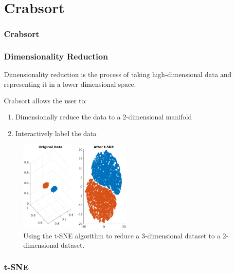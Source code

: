 \documentclass{beamer}
\begin{document}

\section{Crabsort}

\begin{frame}
  \frametitle{Crabsort}
\end{frame}


\begin{frame}
  \frametitle{Dimensionality Reduction}

  Dimensionality reduction is the process of taking high-dimensional data
  and representing it in a lower dimensional space.

  Crabsort allows the user to:

  \begin{enumerate}
    \item Dimensionally reduce the data to a 2-dimensional manifold
    \item Interactively label the data
  \end{enumerate}

  \begin{figure}
    \includegraphics[width=0.5\textwidth]{gfx/t-SNE-example.eps}
    \centering
    \caption{Using the t-SNE algorithm to reduce a 3-dimensional dataset to a 2-dimensional dataset.}
    \label{fig:dimredexample}
  \end{figure}


\end{frame}


\begin{frame}
  \frametitle{t-SNE}
\end{frame}
\end{document}
